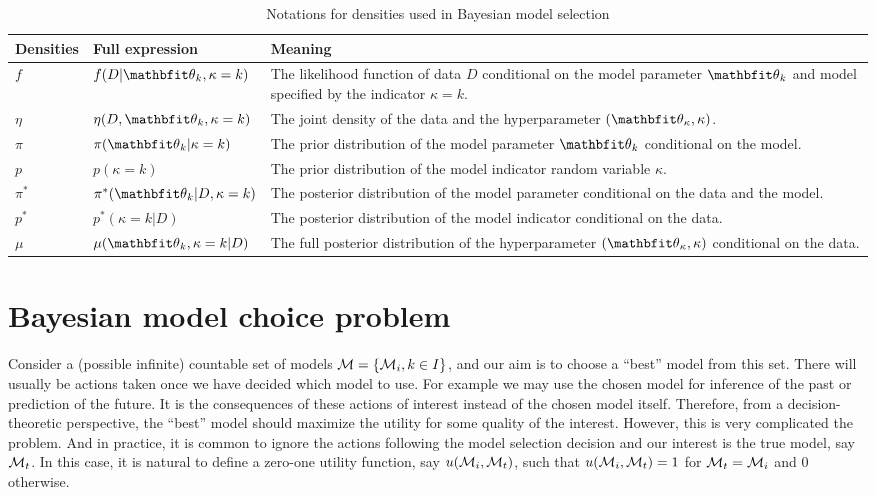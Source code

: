 \begin{table}[ht]
  \caption{Notations for densities used in Bayesian model selection}
  \label{tab:notations}
  \begin{tabularx}{\textwidth}{llX}
    \toprule
    Densities & Full expression & Meaning \\
    \midrule
    $f$ & $f(D|\bth_k,\kappa=k)$
      & The likelihood function of data $D$ conditional on the model parameter $\bth_k$ and model specified by the
      indicator $\kappa = k$. \\
    $\eta$ & $\eta(D,\bth_k,\kappa=k)$
      & The joint density of the data and the hyperparameter $(\bth_{\kappa},\kappa)$. \\
    $\pi$ & $\pi(\bth_k|\kappa=k)$
      & The prior distribution of the model parameter $\bth_k$ conditional on the model. \\
    $p$ & $p(\kappa = k)$
      & The prior distribution of the model indicator random variable $\kappa$. \\
    $\pi^*$ & $\pi^*(\bth_k|D,\kappa=k)$
      & The posterior distribution of the model parameter conditional on the data and the model. \\
    $p^*$ & $p^*(\kappa=k|D)$
      & The posterior distribution of the model indicator conditional on the data. \\
    $\mu$ & $\mu(\bth_k,\kappa=k|D)$
      & The full posterior distribution of the hyperparameter $(\bth_{\kappa},\kappa)$ conditional on the data. \\
    \bottomrule
  \end{tabularx}
\end{table}

\section{Bayesian model choice problem}
\label{sec:Bayesian model choice problem}

Consider a (possible infinite) countable set of models $\mathcal{M} = \{\mathcal{M}_i,
  k\in I\}$, and our aim is to choose a ``best'' model from this set. There
will usually be actions taken once we have decided which model to use. For
example we may use the chosen model for inference of the past or prediction of
the future. It is the consequences of these actions of interest instead of the
chosen model itself. Therefore, from a decision-theoretic perspective, the
``best'' model should maximize the utility for some quality of the interest.
However, this is very complicated the problem. And in practice, it is common
to ignore the actions following the model selection decision and our interest
is the true model, say $\mathcal{M}_t$. In this case, it is natural to define a
zero-one utility function, say $u(\mathcal{M}_i,\mathcal{M}_t)$, such that
$u(\mathcal{M}_i,\mathcal{M}_t) = 1$ for $\mathcal{M}_t = \mathcal{M}_i$ and $0$ otherwise.

